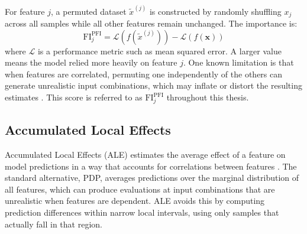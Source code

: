 For feature $j$, a permuted dataset $\tilde{x}^{(j)}$ is constructed by randomly shuffling $x_j$ across all samples while all other features remain unchanged. The importance is:
%
\begin{equation}
    \text{FI}^{\text{PFI}}_j = \mathcal{L}\!\left(f\!\left(\tilde{x}^{(j)}\right)\right) - \mathcal{L}(f(\mathbf{x}))
    \label{eq:pfi}
\end{equation}
%
where $\mathcal{L}$ is a performance metric such as mean squared error. A larger value means the model relied more heavily on feature $j$. One known limitation is that when features are correlated, permuting one independently of the others can generate unrealistic input combinations, which may inflate or distort the resulting estimates \citep{fisher2019modelswrongusefullearning}. This score is referred to as $\text{FI}^{\text{PFI}}_j$ throughout this thesis.

\subsection{Accumulated Local Effects}

Accumulated Local Effects (ALE) estimates the average effect of a feature on model predictions in a way that accounts for correlations between features \citep{apley2020ale}. The standard alternative, PDP, averages predictions over the marginal distribution of all features, which can produce evaluations at input combinations that are unrealistic when features are dependent. ALE avoids this by computing prediction differences within narrow local intervals, using only samples that actually fall in that region.

